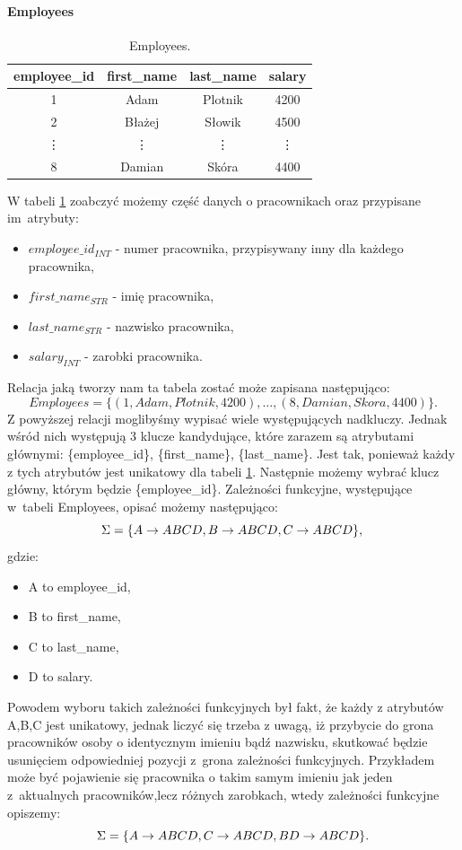 \documentclass{article}
\theoremstyle{break}
\begin{document}
	
	\paragraph{Employees}
	
	\begin{table}[!ht]
		\centering
		\begin{tabular}{|c|c|c|c|}
			\hline
			employee\_id & first\_name & last\_name & salary \\ \hline
			1 & Adam & Plotnik & 4200\\ \hline
			2 & Błażej & Słowik & 4500 \\ \hline
			\vdots & \vdots & \vdots & \vdots \\ \hline
			8 & Damian & Skóra & 4400 \\ \hline
		\end{tabular}
		\caption{Employees.}
		\label{table:employees}
	\end{table}
	W tabeli \ref{table:employees} zoabczyć możemy część danych o pracownikach oraz przypisane im~atrybuty:
	\begin{itemize}
		\item $employee\_id_{INT}$ - numer pracownika, przypisywany inny dla każdego pracownika,
		\item $first\_name_{STR}$ - imię pracownika,
		\item $last\_name_{STR}$ - nazwisko pracownika,
		\item $salary_{INT}$ - zarobki pracownika.
	\end{itemize}
	Relacja jaką tworzy nam ta tabela zostać może zapisana następująco:
	$$ Employees=\{(1, Adam, Plotnik, 4200), \dots,(8, Damian, Skora, 4400)\}. $$
	Z powyższej relacji moglibyśmy wypisać wiele występujących nadkluczy. Jednak wśród nich występują 3 klucze kandydujące, które zarazem są atrybutami głównymi: \{employee\_id\}, \{first\_name\}, \{last\_name\}. Jest tak, ponieważ każdy z tych atrybutów jest unikatowy dla tabeli \ref{table:employees}. Następnie możemy wybrać klucz główny, którym będzie \{employee\_id\}. 	
	Zależności funkcyjne, występujące w~tabeli Employees, opisać możemy następująco:
	$$ \Sigma = \{ A \rightarrow ABCD, B\rightarrow ABCD, C\rightarrow ABCD \}, \\ $$
	gdzie: 
	\begin{itemize}
		\item A to employee\_id,
		\item B to first\_name,
		\item C to last\_name,
		\item D to salary.
	\end{itemize}
	Powodem  wyboru takich zależności funkcyjnych był fakt, że każdy z atrybutów A,B,C jest unikatowy, jednak liczyć się trzeba z uwagą, iż przybycie do grona pracowników osoby o identycznym imieniu bądź nazwisku, skutkować będzie usunięciem odpowiedniej pozycji z~grona zależności funkcyjnych. Przykładem może być pojawienie się pracownika o takim samym imieniu jak jeden z~aktualnych pracowników,lecz różnych zarobkach, wtedy zależności funkcyjne opiszemy:  
	$$ \Sigma = \{ A \rightarrow ABCD, C\rightarrow ABCD, BD\rightarrow ABCD  \}. \\ $$
	
\end{document}
